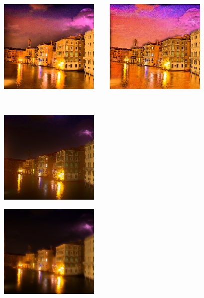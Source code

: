 \begin{figure}[htbp]
\centering
	\begin{minipage}[b]{0.49\hsize}
		\centering
		\includegraphics[width=55mm, height=45mm]{images/experiment/decomp1/srie/reflectance.eps}
	\end{minipage}
	\begin{minipage}[b]{0.49\hsize}
		\centering
		\includegraphics[width=55mm, height=45mm]{images/experiment/decomp1/wvm/reflectance.eps}
	\end{minipage}\\
	\vspace{1.5mm}
	\begin{minipage}[b]{0.49\hsize}
		\centering
		\includegraphics[width=55mm, height=45mm]{images/experiment/decomp1/srie/illumination.eps}
		 \label{fig:decomp_srie}
	\end{minipage}
	\begin{minipage}[b]{0.49\hsize}
		\centering
		\includegraphics[width=55mm, height=45mm]{images/experiment/decomp1/wvm/illumination.eps}

\end{minipage}
\end{figure}
